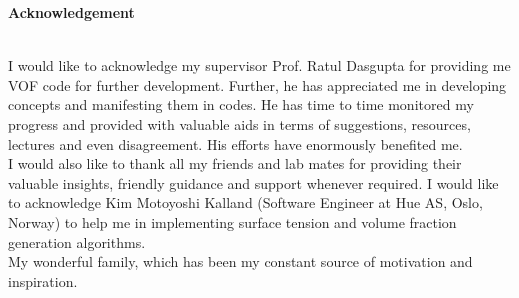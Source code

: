 \begin{center}
\textbf{\large Acknowledgement} 
\end{center}
\indent \\
\indent I would like to acknowledge my supervisor Prof. Ratul Dasgupta for providing me VOF code for further development. Further, he has appreciated me in developing concepts and manifesting them in codes. He has time to time monitored my progress and provided with valuable aids in terms of suggestions, resources, lectures and even disagreement. His efforts have enormously benefited me.\\
\indent I would also like to thank all my friends and lab mates for providing their valuable insights, friendly guidance and support whenever required. I would like to acknowledge Kim Motoyoshi Kalland
(Software Engineer at Hue AS, Oslo, Norway) to help me in implementing surface tension and volume fraction generation algorithms.\\
\indent My wonderful family, which has been my constant source of motivation and inspiration. \\
% 
